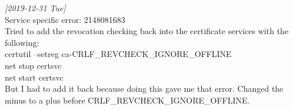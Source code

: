\documentclass[11pt]{article}
\begin{document}
\textit{[2019-12-31 Tue]}\\
Service specific error: 2148081683\\

Tried to add the revocation checking back into the certificate services with the following:\\

certutil –setreg ca\CRLFlags -CRLF\_REVCHECK\_IGNORE\_OFFLINE\\

net stop certsvc\\
net start certsvc\\

But I had to add it back because doing this gave me that error. Changed the minus to a plus before CRLF\_REVCHECK\_IGNORE\_OFFLINE.\\
\end{document}
